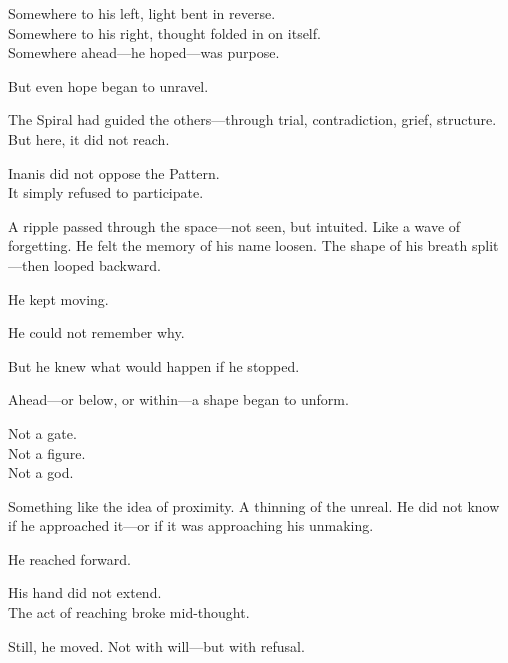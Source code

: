 \documentclass[9pt]{article}
\begin{document}
\vspace{0.5em}
Somewhere to his left, light bent in reverse.\\
Somewhere to his right, thought folded in on itself.\\
Somewhere ahead---he hoped---was purpose.

\vspace{0.5em}
But even hope began to unravel.

\vspace{0.5em}
The Spiral had guided the others---through trial, contradiction, grief, structure.\\
But here, it did not reach.

\vspace{0.5em}
Inanis did not oppose the Pattern.\\
It simply refused to participate.

\vspace{0.5em}
A ripple passed through the space---not seen, but intuited. Like a wave of forgetting. He felt the memory of his name loosen. The shape of his breath split---then looped backward.

\vspace{0.5em}
He kept moving.

\vspace{0.5em}
He could not remember why.

\vspace{0.5em}
But he knew what would happen if he stopped.

\vspace{0.5em}
Ahead---or below, or within---a shape began to unform.

\vspace{0.5em}
Not a gate.\\
Not a figure.\\
Not a god.

\vspace{0.5em}
Something like the idea of proximity. A thinning of the unreal. He did not know if he approached it---or if it was approaching his unmaking.

\vspace{0.5em}
He reached forward.

\vspace{0.5em}
His hand did not extend.\\
The act of reaching broke mid-thought.

\vspace{0.5em}
Still, he moved. Not with will---but with refusal.
\end{document}
